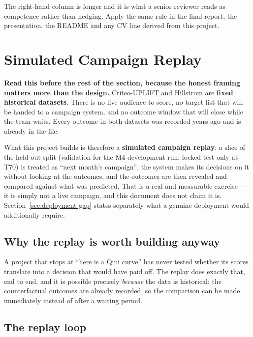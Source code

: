 \documentclass[11pt,a4paper]{article}
\begin{document}
The right-hand column is longer and it is what a senior reviewer reads as competence rather than
hedging. Apply the same rule in the final report, the presentation, the README and any CV line
derived from this project.
\section{Simulated Campaign Replay}
\label{sec:lifecycle}

\begin{alertbox}
\textbf{Read this before the rest of the section, because the honest framing matters more than the
design.} Criteo-UPLIFT and Hillstrom are \textbf{fixed historical datasets}. There is no live
audience to score, no target list that will be handed to a campaign system, and no outcome window
that will close while the team waits. Every outcome in both datasets was recorded years ago and is
already in the file.

What this project builds is therefore a \textbf{simulated campaign replay}: a slice of the
held-out split (validation for the M4 development run; locked test only at T70) is treated as
``next month's campaign'', the system makes its decisions on it
without looking at the outcomes, and the outcomes are then revealed and compared against what was
predicted. That is a real and measurable exercise --- it is simply not a live campaign, and this
document does not claim it is. Section~\ref{sec:deployment-gap} states separately what a genuine
deployment would additionally require.
\end{alertbox}

\subsection{Why the replay is worth building anyway}

A project that stops at ``here is a Qini curve'' has never tested whether its scores translate into
a decision that would have paid off. The replay does exactly that, end to end, and it is possible
precisely \emph{because} the data is historical: the counterfactual outcomes are already recorded,
so the comparison can be made immediately instead of after a waiting period.

\subsection{The replay loop}
\end{document}
